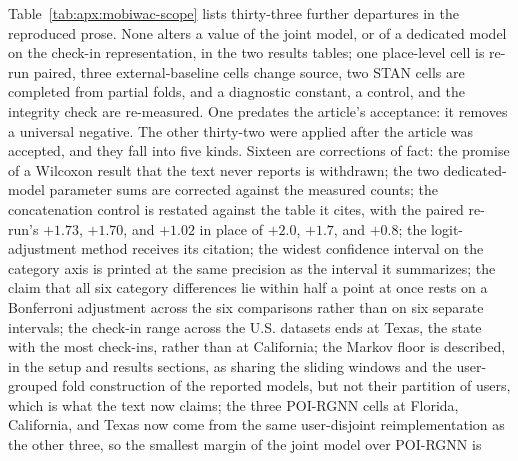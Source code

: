 Table~\ref{tab:apx:mobiwac-scope} lists thirty-three further departures in the reproduced prose.
None alters a value of the joint model, or of a dedicated model on the check-in representation,
in the two results tables; one place-level cell is re-run paired, three external-baseline cells
change source, two STAN cells are completed from partial folds, and a diagnostic constant, a
control, and the integrity check are re-measured. One predates the article's acceptance: it removes a
universal negative. The
other thirty-two were applied after the article was accepted, and they fall into five kinds. Sixteen
are corrections of fact: the promise of a Wilcoxon result that the text never reports is
withdrawn; the two dedicated-model parameter sums are corrected against the measured counts;
the concatenation control is restated against the table it cites, with the paired re-run's $+1.73$,
$+1.70$, and $+1.02$ in place of $+2.0$, $+1.7$, and $+0.8$; the logit-adjustment method
receives its citation; the widest confidence interval on the category axis is
printed at the same precision as the interval it summarizes; the claim that all six category
differences lie within half a point at once rests on a Bonferroni adjustment across the six
comparisons rather than on six separate intervals; the check-in range across the
U.S. datasets ends at Texas, the state with the most check-ins, rather than at California; the
Markov floor is described, in the setup and results sections, as sharing the sliding windows and the
user-grouped fold construction of the reported models, but not their partition of users, which is
what the text now claims; the three POI-RGNN cells at Florida, California, and Texas now come from the same user-disjoint
reimplementation as the other three, so the smallest margin of the joint model over POI-RGNN is
